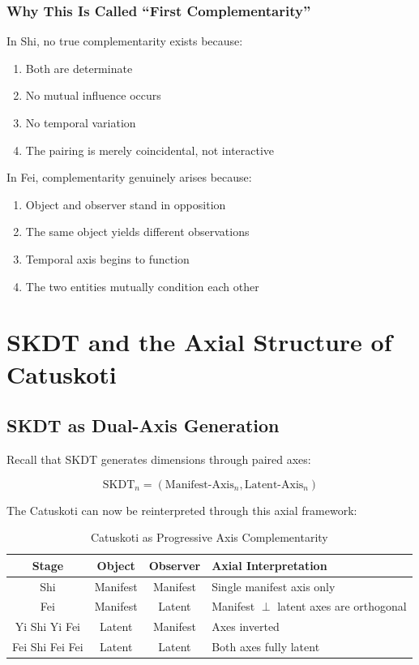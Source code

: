 \documentclass[12pt,a4paper]{article}
\begin{document}
\subsubsection{Why This Is Called ``First Complementarity''}

In Shi, no true complementarity exists because:

\begin{enumerate}
    \item Both are determinate
    \item No mutual influence occurs
    \item No temporal variation
    \item The pairing is merely coincidental, not interactive
\end{enumerate}

In Fei, complementarity genuinely arises because:

\begin{enumerate}
    \item Object and observer stand in opposition
    \item The same object yields different observations
    \item Temporal axis begins to function
    \item The two entities mutually condition each other
\end{enumerate}

\section{SKDT and the Axial Structure of Catuskoti}

\subsection{SKDT as Dual-Axis Generation}

Recall that SKDT generates dimensions through paired axes:

\begin{equation}
\text{SKDT}_n = (\text{Manifest-Axis}_n, \text{Latent-Axis}_n)
\end{equation}

The Catuskoti can now be reinterpreted through this axial framework:

\begin{table}[htbp]
\centering
\begin{tabularx}{\textwidth}{|c|c|c|>{\raggedright\arraybackslash}X|}
\hline
\textbf{Stage} & \textbf{Object} & \textbf{Observer} & \textbf{Axial Interpretation} \\
\hline
Shi & Manifest & Manifest & Single manifest axis only \\
\hline
Fei & Manifest & Latent & Manifest $\perp$ latent axes are orthogonal \\
\hline
Yi Shi Yi Fei & Latent & Manifest & Axes inverted \\
\hline
Fei Shi Fei Fei & Latent & Latent & Both axes fully latent \\
\hline
\end{tabularx}
\caption{Catuskoti as Progressive Axis Complementarity}
\end{table}
\end{document}
